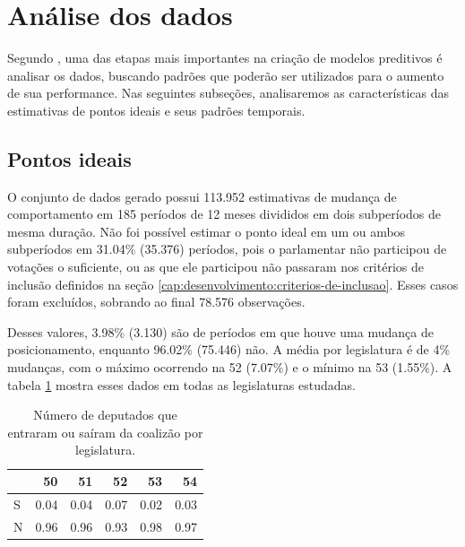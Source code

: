 \documentclass[a4paper,titlepage]{ppgi}\usepackage[]{graphicx}\usepackage[]{color}
\newenvironment{knitrout}{}{} %
\begin{document}
\section{Análise dos dados}
\label{cap:desenvolvimento:analise}

Segundo , uma das etapas mais importantes na criação de
modelos preditivos é analisar os dados, buscando padrões que poderão ser
utilizados para o aumento de sua performance. Nas seguintes subseções,
analisaremos as características das estimativas de pontos ideais e seus padrões
temporais.

\subsection{Pontos ideais}



O conjunto de dados gerado possui 113.952 estimativas de mudança
de comportamento em 185 períodos de 12 meses divididos em dois
subperíodos de mesma duração. Não foi possível estimar o ponto ideal em um ou
ambos subperíodos em 31.04\%
(35.376) períodos, pois o parlamentar não participou de
votações o suficiente, ou as que ele participou não passaram nos critérios de
inclusão definidos na seção \ref{cap:desenvolvimento:criterios-de-inclusao}. Esses casos
foram excluídos, sobrando ao final 78.576 observações.

Desses valores, 3.98\%
(3.130) são de períodos em que houve uma mudança de
posicionamento, enquanto 96.02\% (75.446) não. A média por legislatura é de
4\% mudanças,
com o máximo ocorrendo na 52\textordfeminine{}
(7.07\%) e o
mínimo na 53\textordfeminine{}
(1.55\%).  A
tabela \ref{table:coalition-changes-per-legislature} mostra esses dados em
todas as legislaturas estudadas.

\begin{table}
\centering
\begin{knitrout}
\color{fgcolor}
\begin{tabular}{l|r|r|r|r|r}
\hline
  & 50 & 51 & 52 & 53 & 54\\
\hline
S & 0.04 & 0.04 & 0.07 & 0.02 & 0.03\\
\hline
N & 0.96 & 0.96 & 0.93 & 0.98 & 0.97\\
\hline
\end{tabular}


\end{knitrout}
\caption{Número de deputados que entraram ou saíram da coalizão por legislatura.}
\label{table:coalition-changes-per-legislature}
\end{table}
\end{document}
